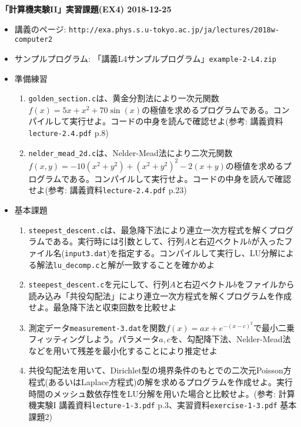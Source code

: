 \documentclass[11pt]{jarticle}
\begin{document}
\noindent
{\bf\large 「計算機実験II」実習課題(EX4) 2018-12-25}
\\[-0.5em]

\noindent
\begin{itemize}
\item 講義のページ: \verb+http://exa.phys.s.u-tokyo.ac.jp/ja/lectures/2018w-computer2+

\item サンプルプログラム: 「講義L4サンプルプログラム」{\tt example-2-L4.zip}

\item 準備練習
  
\begin{enumerate}
  \item {\tt golden\_section.c}は、黄金分割法により一次元関数$f(x) = 5x+x^2+70\sin(x)$の極値を求めるプログラムである。コンパイルして実行せよ。コードの中身を読んで確認せよ(参考: 講義資料{\tt lecture-2.4.pdf} p.8)
  \item {\tt nelder\_mead\_2d.c}は、Nelder-Mead法により二次元関数$f(x, y) = −10(x^2 + y^2) + (x^2 + y^2)^2 − 2(x + y)$の極値を求めるプログラムである。コンパイルして実行せよ。コードの中身を読んで確認せよ(参考: 講義資料{\tt lecture-2.4.pdf} p.23)
\end{enumerate}

\item 基本課題
  \begin{enumerate}
  \item {\tt steepest\_descent.c}は、最急降下法により連立一次方程式を解くプログラムである。実行時には引数として、行列$A$と右辺ベクトル$b$が入ったファイル名({\tt input3.dat})を指定する。コンパイルして実行し、LU分解による解法{\tt lu\_decomp.c}と解が一致することを確かめよ
  \item {\tt steepest\_descent.c}を元にして、行列$A$と右辺ベクトル$b$をファイルから読み込み「共役勾配法」により連立一次方程式を解くプログラムを作成せよ。最急降下法と収束回数を比較せよ
  \item 測定データ{\tt measurement-3.dat}を関数$f(x)=ax+e^{−(x−c)^2}$で最小二乗フィッティングしよう。パラメータ$a, c$を、勾配降下法、Nelder-Mead法などを用いて残差を最小化することにより推定せよ
  \item 共役勾配法を用いて、Dirichlet型の境界条件のもとでの二次元Poisson方程式(あるいはLaplace方程式)の解を求めるプログラムを作成せよ。実行時間のメッシュ数依存性をLU分解を用いた場合と比較せよ。(参考: 計算機実験I 講義資料{\tt lecture-1-3.pdf} p.3、実習資料{\tt exercise-1-3.pdf} 基本課題2)


\end{enumerate}
\end{itemize}
\end{document}
